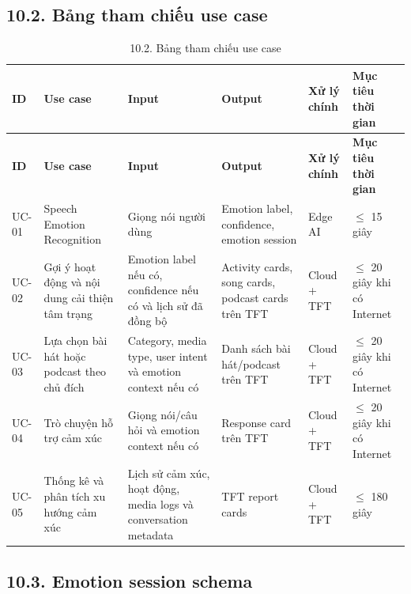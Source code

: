 \documentclass[12pt,a4paper]{article}
\begin{document}
\subsection*{10.2. Bảng tham chiếu use case}

\begin{center}
\scriptsize
\setlength{\tabcolsep}{3pt}
\begin{longtable}{|P{0.08\textwidth}|P{0.20\textwidth}|P{0.21\textwidth}|P{0.21\textwidth}|P{0.10\textwidth}|P{0.10\textwidth}|}
\caption{10.2. Bảng tham chiếu use case}\\
\hline
\textbf{ID} & \textbf{Use case} & \textbf{Input} & \textbf{Output} & \textbf{Xử lý chính} & \textbf{Mục tiêu thời gian} \\
\hline
\endfirsthead
\hline
\textbf{ID} & \textbf{Use case} & \textbf{Input} & \textbf{Output} & \textbf{Xử lý chính} & \textbf{Mục tiêu thời gian} \\
\hline
\endhead
UC-01 & Speech Emotion Recognition & Giọng nói người dùng & Emotion label, confidence, emotion session & Edge AI & $\leq$ 15 giây \\
\hline
UC-02 & Gợi ý hoạt động và nội dung cải thiện tâm trạng & Emotion label nếu có, confidence nếu có và lịch sử đã đồng bộ & Activity cards, song cards, podcast cards trên TFT & Cloud + TFT & $\leq$ 20 giây khi có Internet \\
\hline
UC-03 & Lựa chọn bài hát hoặc podcast theo chủ đích & Category, media type, user intent và emotion context nếu có & Danh sách bài hát/podcast trên TFT & Cloud + TFT & $\leq$ 20 giây khi có Internet \\
\hline
UC-04 & Trò chuyện hỗ trợ cảm xúc & Giọng nói/câu hỏi và emotion context nếu có & Response card trên TFT & Cloud + TFT & $\leq$ 20 giây khi có Internet \\
\hline
UC-05 & Thống kê và phân tích xu hướng cảm xúc & Lịch sử cảm xúc, hoạt động, media logs và conversation metadata & TFT report cards & Cloud + TFT & $\leq$ 180 giây \\
\hline
\end{longtable}
\setlength{\tabcolsep}{6pt}
\normalsize
\end{center}


\subsection*{10.3. Emotion session schema}
\end{document}
